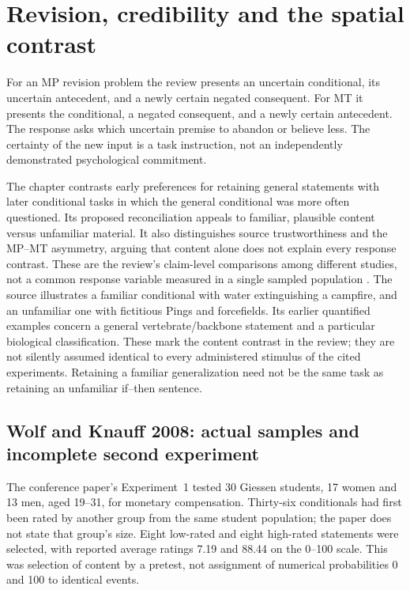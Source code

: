 \section{Revision, credibility and the spatial contrast}
\label{sec:p19-r54-revision-evidence}

For an MP revision problem the review presents an uncertain conditional,
its uncertain antecedent, and a newly certain negated consequent. For MT
it presents the conditional, a negated consequent, and a newly certain
antecedent. The response asks which uncertain premise to abandon or
believe less. The certainty of the new input is a task instruction, not
an independently demonstrated psychological commitment.

The chapter contrasts early preferences for retaining general statements
with later conditional tasks in which the general conditional was more
often questioned. Its proposed reconciliation appeals to familiar,
plausible content versus unfamiliar material. It also distinguishes
source trustworthiness and the MP--MT asymmetry, arguing that content
alone does not explain every response contrast. These are the review's
claim-level comparisons among different studies, not a common response
variable measured in a single sampled population
\cite[\S3.1]{GazzoCastanedaKnauff2021Defeasible}.
The source illustrates a familiar conditional with water extinguishing
a campfire, and an unfamiliar one with fictitious Pings and forcefields.
Its earlier quantified examples concern a general vertebrate/backbone
statement and a particular biological classification. These mark the
content contrast in the review; they are not silently assumed identical
to every administered stimulus of the cited experiments. Retaining a
familiar generalization need not be the same task as retaining an
unfamiliar if--then sentence.

\subsection{Wolf and Knauff 2008: actual samples and incomplete second experiment}

The conference paper's Experiment~1 tested 30 Giessen students, 17 women
and 13 men, aged 19--31, for monetary compensation. Thirty-six conditionals
had first been rated by another group from the same student population;
the paper does not state that group's size. Eight low-rated and eight
high-rated statements were selected, with reported average ratings 7.19
and 88.44 on the 0--100 scale. This was selection of content by a pretest,
not assignment of numerical probabilities 0 and 100 to identical events.

